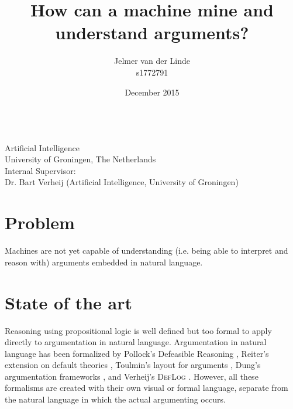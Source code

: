 \documentclass[a4paper]{article}
\begin{document}
\title{How can a machine mine and understand arguments?}
\author{Jelmer van der Linde\\s1772791}
\date{December 2015}

\begingroup

\maketitle
{}

\vspace*{250pt}
\\
Artificial Intelligence\\
University of Groningen, The Netherlands\\[\baselineskip]
Internal Supervisor:\\
Dr. Bart Verheij (Artificial Intelligence, University of Groningen)

\endgroup

\newpage

\section*{Problem}
Machines are not yet capable of understanding (i.e. being able to interpret and reason with) arguments embedded in natural language.

\section*{State of the art}
Reasoning using propositional logic is well defined but too formal to apply directly to argumentation in natural language. Argumentation in natural language has been formalized by Pollock's Defeasible Reasoning \citep{Pollock:1987defeasible}, Reiter's extension on default theories \citep{Reiter:1980ix}, Toulmin's layout for arguments \citep{Toulmin:2003uses}, Dung's argumentation frameworks \citep{Dung:1995dsa}, and Verheij's \textsc{DefLog} \citep{Verheij:2003gx}. However, all these formalisms are created with their own visual or formal language, separate from the natural language in which the actual argumenting occurs.
\end{document}

